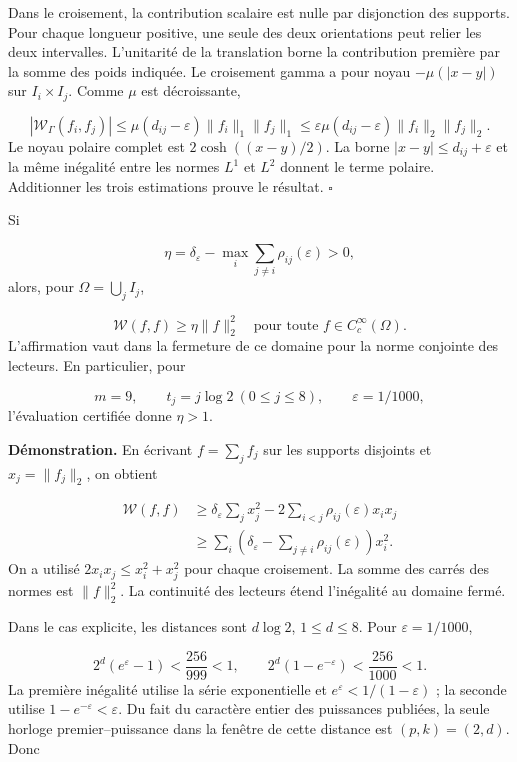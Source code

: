 Dans le croisement, la contribution scalaire est nulle par disjonction des supports. Pour chaque longueur positive, une seule des deux orientations peut relier les deux intervalles. L’unitarité de la translation borne la contribution première par la somme des poids indiquée. Le croisement gamma a pour noyau \(-\mu(|x-y|)\) sur \(I_i\times I_j\). Comme \(\mu\) est décroissante,

\[
|\mathscr W_\Gamma(f_i,f_j)|
\leq\mu(d_{ij}-\varepsilon)\|f_i\|_1\|f_j\|_1
\leq\varepsilon\mu(d_{ij}-\varepsilon)\|f_i\|_2\|f_j\|_2.
\]
Le noyau polaire complet est \(2\cosh((x-y)/2)\). La borne \(|x-y|\leq d_{ij}+\varepsilon\) et la même inégalité entre les normes \(L^1\) et \(L^2\) donnent le terme polaire. Additionner les trois estimations prouve le résultat. \hfill\(\square\)

Si

\[
\eta=\delta_\varepsilon-
\max_i\sum_{j\neq i}\rho_{ij}(\varepsilon)>0,
\]
alors, pour \(\Omega=\bigcup_j I_j\),

\[
\boxed{\mathscr W(f,f)\geq\eta\|f\|_2^2
\quad\text{pour toute }f\in C_c^\infty(\Omega).}
\]
L’affirmation vaut dans la fermeture de ce domaine pour la norme conjointe des lecteurs. En particulier, pour

\[
m=9,\qquad t_j=j\log2\ (0\leq j\leq8),\qquad
\varepsilon=1/1000,
\]
l’évaluation certifiée donne \(\eta>1\).

\textbf{Démonstration.} En écrivant \(f=\sum_jf_j\) sur les supports disjoints et \(x_j=\|f_j\|_2\), on obtient

\[
\begin{aligned}
\mathscr W(f,f)&\geq
\delta_\varepsilon\sum_jx_j^2
-2\sum_{i<j}\rho_{ij}(\varepsilon)x_ix_j\\
&\geq\sum_i\left(\delta_\varepsilon-
\sum_{j\neq i}\rho_{ij}(\varepsilon)\right)x_i^2.
\end{aligned}
\]
On a utilisé \(2x_ix_j\leq x_i^2+x_j^2\) pour chaque croisement. La somme des carrés des normes est \(\|f\|_2^2\). La continuité des lecteurs étend l’inégalité au domaine fermé.

Dans le cas explicite, les distances sont \(d\log2\), \(1\leq d\leq8\). Pour \(\varepsilon=1/1000\),

\[
2^d(e^\varepsilon-1)<\frac{256}{999}<1,
\qquad 2^d(1-e^{-\varepsilon})<\frac{256}{1000}<1.
\]
La première inégalité utilise la série exponentielle et \(e^\varepsilon<1/(1-\varepsilon)\) ; la seconde utilise \(1-e^{-\varepsilon}<\varepsilon\). Du fait du caractère entier des puissances publiées, la seule horloge premier–puissance dans la fenêtre de cette distance est \((p,k)=(2,d)\). Donc

